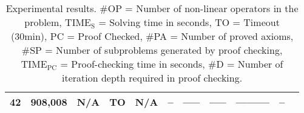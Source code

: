 \begin{table}[h]
\begin{center}
\begin{tabular}{|r||r|r|r||r||c|r|r|r|r|r|}
      \hline
       42&  908,008&       N/A&       TO&             N/A&--&  -----& -----& --------- & --\\
      \hline
    \end{tabular}
  \end{center}
  \caption{
    Experimental results.
    \#OP = Number of non-linear operators in the problem,
    $\mathrm{TIME_S}$ = Solving time in seconds,
    TO = Timeout (30min),
    PC = Proof Checked,
    \#PA = Number of proved axioms,
    \#SP = Number of subproblems generated by proof checking,
    $\mathrm{TIME_{PC}}$ = Proof-checking time in seconds,
    \#D = Number of iteration depth required in proof checking.
  }\label{tbl:exp}
\end{table}
